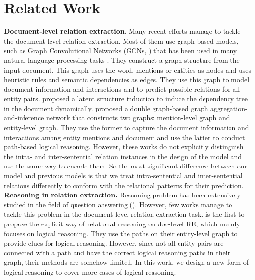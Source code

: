 \documentclass[11pt,a4paper]{article}
\begin{document}
 \section{Related Work}
\textbf{Document-level relation extraction.} Many recent efforts \citep{quirk-poon-17-distant,peng-etal-17-cross,DBLP:conf/aaai/GuptaRSR19,song-etal-2018,n-ary,DocRED-paper,finetune-bert,HIN,LSR,GAIN,GLRE,CFER} manage to tackle the document-level relation extraction. 
Most of them use graph-based models, such as Graph Convolutional Networks (GCNs, \citealp{GCN,RGCN}) that has been used in many natural language processing tasks \citep{marcheggiani-titov-2017,DBLP:conf/aaai/YaoM019,liu-etal-2020}. They construct a graph structure from the input document. This graph uses the word, mentions or entities as nodes and uses heuristic rules and semantic dependencies as edges. They use this graph to model document information and interactions and to predict possible relations for all entity pairs. 
\citet{LSR} proposed a latent structure induction to induce the dependency tree in the document dynamically.
\citet{GAIN} proposed a double graph-based graph aggregation-and-inference network that constructs two graphs: mention-level graph and entity-level graph. They use the former to capture the document information and interactions among entity mentions and document and use the latter to conduct path-based logical reasoning.
However, these works do not explicitly distinguish the intra- and inter-sentential relation instances in the design of the model and use the same way to encode them. So the most significant difference between our model and previous models is that we treat intra-sentential and inter-sentential relations differently to conform with the relational patterns for their prediction. \\
\noindent
\textbf{Reasoning in relation extraction.} Reasoning problem has been extensively studied in the field of question answering (\citealp{C-GRU}). However, few works manage to tackle this problem in the document-level relation extraction task.
\citet{GAIN} is the first to propose the explicit way of relational reasoning on doc-level RE, which mainly focuses on logical reasoning. They use the paths on their entity-level graph to provide clues for logical reasoning. However, since not all entity pairs are connected with a path and have the correct logical reasoning paths in their graph, their methods are somehow limited.
In this work, we design a new form of logical reasoning to cover more cases of logical reasoning.
%
\end{document}
